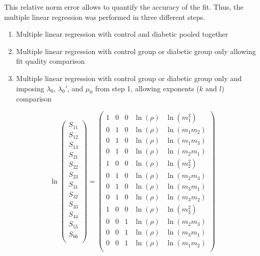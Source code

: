 \documentclass[a4paper,fleqn]{DC_ArtStyle}
\begin{document}
	This relative norm error allows to quantify the accuracy of the fit.
	Thus, the multiple linear regression was performed in three different steps.
	\begin{enumerate}
		\item Multiple linear regression with control and diabetic pooled together
		\item Multiple linear regression with control group or diabetic group only allowing fit quality comparison
		\item Multiple linear regression with control group or diabetic group only and imposing $\lambda_0$, $\lambda_0'$, and $\mu_0$ from step 1, allowing exponents ($k$ and $l$) comparison
	\end{enumerate}

	\begin{equation}
		\ln
		\begin{pmatrix}
		S_{11} \\
		S_{12} \\
		S_{13} \\
		S_{21} \\
		S_{22} \\
		S_{23} \\
		S_{31} \\
		S_{32} \\
		S_{33} \\
		S_{44} \\
		S_{55} \\
		S_{66} \\
		\end{pmatrix} = \begin{pmatrix}
		1 & 0 & 0 & \ln(\rho) & \ln(m_1^2) \\
		0 & 1 & 0 & \ln(\rho) & \ln(m_1 m_2) \\
		0 & 1 & 0 & \ln(\rho) & \ln(m_1 m_3) \\
		0 & 1 & 0 & \ln(\rho) & \ln(m_2 m_1) \\
		1 & 0 & 0 & \ln(\rho) & \ln(m_2^2) \\
		0 & 1 & 0 & \ln(\rho) & \ln(m_2 m_3) \\
		0 & 1 & 0 & \ln(\rho) & \ln(m_3 m_1) \\
		0 & 1 & 0 & \ln(\rho) & \ln(m_3 m_2) \\
		1 & 0 & 0 & \ln(\rho) & \ln(m_3^2) \\
		0 & 0 & 1 & \ln(\rho) & \ln(m_2 m_3) \\
		0 & 0 & 1 & \ln(\rho) & \ln(m_3 m_1) \\
		0 & 0 & 1 & \ln(\rho) & \ln(m_1 m_2) \\

\end{pmatrix}
\end{equation}
\end{document}
